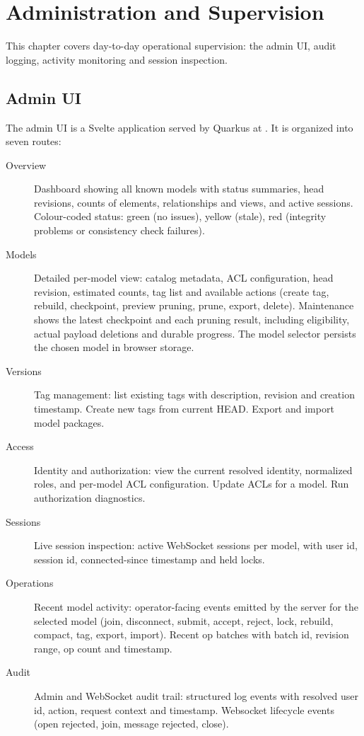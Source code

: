 \section{Administration and Supervision}
\label{sec:AdminOperations}

This chapter covers day-to-day operational supervision: the admin UI, audit
logging, activity monitoring and session inspection.

\subsection{Admin UI}

The admin UI is a Svelte application served by Quarkus at
. It is organized into seven routes:

\begin{description}
\item[Overview] Dashboard showing all known models with status summaries,
  head revisions, counts of elements, relationships and views, and active sessions.
  Colour-coded status: green (no issues), yellow (stale), red (integrity
  problems or consistency check failures).

\item[Models] Detailed per-model view: catalog metadata, ACL configuration,
  head revision, estimated counts, tag list and available actions (create
  tag, rebuild, checkpoint, preview pruning, prune, export, delete).
  Maintenance shows the latest checkpoint and each pruning result, including
  eligibility, actual payload deletions and durable progress. The model selector persists the
  chosen model in browser storage.

\item[Versions] Tag management: list existing tags with description,
  revision and creation timestamp. Create new tags from current HEAD. Export
  and import model packages.

\item[Access] Identity and authorization: view the current resolved identity,
  normalized roles, and per-model ACL configuration. Update ACLs for a
  model. Run authorization diagnostics.

\item[Sessions] Live session inspection: active WebSocket sessions per
  model, with user id, session id, connected-since timestamp and held locks.

\item[Operations] Recent model activity: operator-facing events emitted by
  the server for the selected model (join, disconnect, submit, accept,
  reject, lock, rebuild, compact, tag, export, import). Recent op batches
  with batch id, revision range, op count and timestamp.

\item[Audit] Admin and WebSocket audit trail: structured log events with
  resolved user id, action, request context and timestamp. Websocket
  lifecycle events (open rejected, join, message rejected, close).
\end{description}

